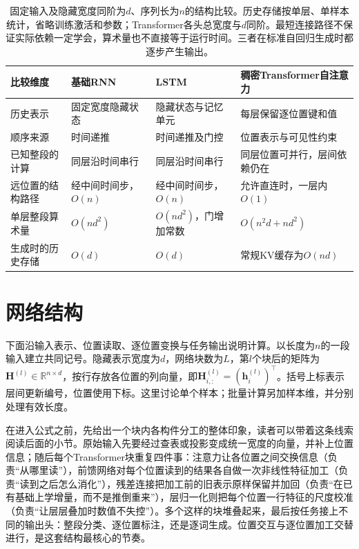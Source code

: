 \begin{table}[htbp]
  \centering
  \small
  \begin{tabular}{@{}p{28mm}p{39mm}p{40mm}p{48mm}@{}}
    \toprule
    比较维度 & 基础RNN & LSTM & 稠密Transformer自注意力 \\
    \midrule
    历史表示 & 固定宽度隐藏状态 & 隐藏状态与记忆单元 & 每层保留逐位置键和值 \\
    顺序来源 & 时间递推 & 时间递推及门控 & 位置表示与可见性约束 \\
    已知整段的计算 & 同层沿时间串行 & 同层沿时间串行 & 同层位置可并行，层间依赖仍在 \\
    远位置的结构路径 & 经中间时间步，$O(n)$ & 经中间时间步，$O(n)$ & 允许直连时，一层内$O(1)$ \\
    单层整段算术量 & $O(nd^2)$ & $O(nd^2)$，门增加常数 & $O(n^2d+nd^2)$ \\
    生成时的历史存储 & $O(d)$ & $O(d)$ & 常规KV缓存为$O(nd)$ \\
    \bottomrule
  \end{tabular}
  \caption{固定输入及隐藏宽度同阶为$d$、序列长为$n$的结构比较。历史存储按单层、单样本统计，省略训练激活和参数；Transformer各头总宽度与$d$同阶。最短连接路径不保证实际依赖一定学会，算术量也不直接等于运行时间。三者在标准自回归生成时都逐步产生输出。}
  \label{tab:transformer-rnn-comparison}
\end{table}

\FloatBarrier
\section{网络结构}
\label{sec:transformer-structure}

下面沿输入表示、位置读取、逐位置变换与任务输出说明计算。以长度为$n$的一段输入建立共同记号。隐藏表示宽度为$d$，网络块数为$L$，第$l$个块后的矩阵为$\bm H^{(l)}\in\mathbb R^{n\times d}$，按行存放各位置的列向量，即$\bm H_{i,:}^{(l)}=(\bm h_i^{(l)})^{\top}$。括号上标表示层间更新编号，位置使用下标。这里讨论单个样本；批量计算另加样本维，并分别处理有效长度。

在进入公式之前，先给出一个块内各构件分工的整体印象，读者可以带着这条线索阅读后面的小节。原始输入先要经过查表或投影变成统一宽度的向量，并补上位置信息；随后每个Transformer块重复四件事：注意力让各位置之间交换信息（负责“从哪里读”），前馈网络对每个位置读到的结果各自做一次非线性特征加工（负责“读到之后怎么消化”），残差连接把加工前的旧表示原样保留并加回（负责“在已有基础上学增量，而不是推倒重来”），层归一化则把每个位置一行特征的尺度校准（负责“让层层叠加时数值不失控”）。多个这样的块堆叠起来，最后按任务接上不同的输出头：整段分类、逐位置标注，还是逐词生成。位置交互与逐位置加工交替进行，是这套结构最核心的节奏。

